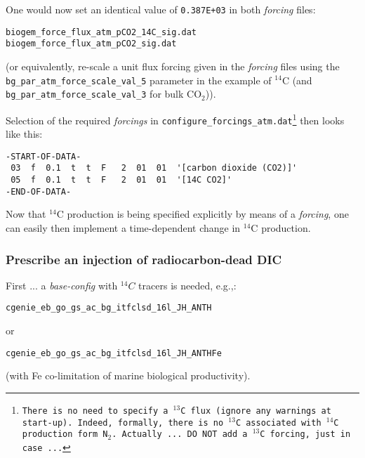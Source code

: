 \documentclass[11pt,fleqn]{book} %
\begin{document}
\noindent One would now set an identical value of \texttt{0.387E+03} in both \textit{forcing} files:
\vspace{-2mm}\small\begin{verbatim}
biogem_force_flux_atm_pCO2_14C_sig.dat
biogem_force_flux_atm_pCO2_sig.dat
\end{verbatim}\normalsize\vspace{-2mm}
(or equivalently, re-scale a unit flux forcing given in the \textit{forcing} files using the \texttt{bg\_par\_atm\_force\_scale\_val\_5} parameter in the example of \(^{14}\)C (and \texttt{bg\_par\_atm\_force\_scale\_val\_3} for bulk CO\(_{2}\))).

\noindent Selection of the required \textit{forcings} in \texttt{configure\_forcings\_atm.dat\footnote{There is no need to specify a \(^{13}\)C flux (ignore any warnings at start-up). Indeed, formally, there is no \(^{13}\)C associated with \(^{14}\)C production form N\(_{2}\). Actually ... DO NOT add a \(^{13}\)C forcing, just in case ...}} then looks like this:
\vspace{-2mm}\small\begin{verbatim}
-START-OF-DATA-
 03  f  0.1  t  t  F   2  01  01  '[carbon dioxide (CO2)]'
 05  f  0.1  t  t  F   2  01  01  '[14C CO2]'
-END-OF-DATA-
\end{verbatim}\normalsize\vspace{-2mm}

Now that \(^{14}\)C production is being specified explicitly by means of a \textit{forcing}, one can easily then implement a time-dependent change in \(^{14}\)C production.

%
\newpage
\subsubsection{Prescribe an injection of radiocarbon-dead DIC}
\vspace{1mm}

First ... a \textit{base-config} with \(^{14}C\) tracers is needed, e.g.,:
\vspace{-2mm}\small\begin{verbatim}
cgenie_eb_go_gs_ac_bg_itfclsd_16l_JH_ANTH
\end{verbatim}\normalsize\vspace{-2mm}
or
\vspace{-2mm}\small\begin{verbatim}
cgenie_eb_go_gs_ac_bg_itfclsd_16l_JH_ANTHFe
\end{verbatim}\normalsize\vspace{-2mm}
(with Fe co-limitation of marine biological productivity).
\end{document}
